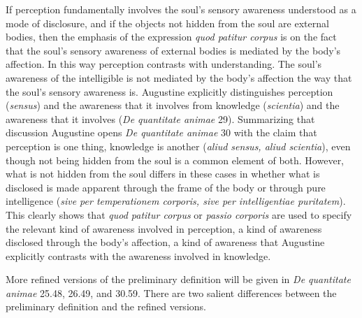 \documentclass[12pt]{article}
\begin{document}

If perception fundamentally involves the soul's sensory awareness understood as a mode of disclosure, and if the objects not hidden from the soul are external bodies, then the emphasis of the expression \emph{quod patitur corpus} is on the fact that the soul's sensory awareness of external bodies is mediated by the body's affection. In this way perception contrasts with understanding. The soul's awareness of the intelligible is not mediated by the body's affection the way that the soul's sensory awareness is. Augustine explicitly distinguishes perception (\emph{sensus}) and the awareness that it involves from knowledge (\emph{scientia}) and the awareness that it involves (\emph{De quantitate animae} 29). Summarizing that discussion Augustine opens \emph{De quantitate animae} 30 with the claim that perception is one thing, knowledge is another (\emph{aliud sensus, aliud scientia}), even though not being hidden from the soul is a common element of both. However, what is not hidden from the soul differs in these cases in whether what is disclosed is made apparent through the frame of the body or through pure intelligence (\emph{sive per temperationem corporis, sive per intelligentiae puritatem}). This clearly shows that \emph{quod patitur corpus} or \emph{passio corporis} are used to specify the relevant kind of awareness involved in perception, a kind of awareness disclosed through the body's affection, a kind of awareness that Augustine explicitly contrasts with the awareness involved in knowledge.

More refined versions of the preliminary definition will be given in \emph{De quantitate animae} 25.48, 26.49, and 30.59.
%
%
There are two salient differences between the preliminary definition and the refined versions.
\end{document}
